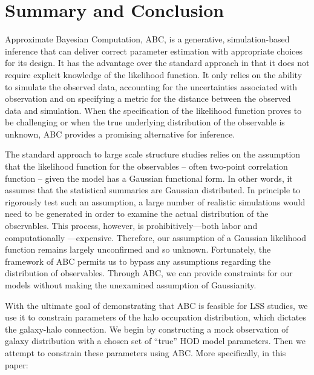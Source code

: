 \documentclass[fleqn,usenatbib]{mnras}
\begin{document}
\section{Summary and Conclusion}\label{sec:discussion}

Approximate Bayesian Computation, ABC, is a generative, simulation-based
inference that can deliver correct parameter estimation with
appropriate choices for its design.
It has the advantage over the standard approach in that it 
does not require explicit knowledge of the likelihood function. It only relies on the ability to simulate
the observed data, accounting for the uncertainties associated with observation and on specifying a metric 
for the distance between the observed data and simulation. When the specification of the likelihood function 
proves to be challenging or when the true underlying distribution of the observable is unknown, 
ABC provides a promising alternative for inference.

The standard approach to large scale structure studies relies on the assumption that the likelihood function 
for the observables -- often two-point correlation function -- given the model has a Gaussian functional form. 
In other words, it assumes that the statistical summaries are Gaussian distributed. In principle to rigorously 
test such an assumption, a large number of realistic simulations would need to be generated in order to examine 
the actual distribution of the observables. This process, however, is prohibitively---both labor and computationally 
---expensive. Therefore, our assumption of a Gaussian likelihood function remains largely unconfirmed and so 
unknown. Fortunately, the framework of ABC permits us to bypass any 
assumptions regarding the distribution of observables. Through ABC, we can provide constraints for our models without making the unexamined assumption of Gaussianity. 

With the ultimate goal of demonstrating that ABC is feasible for LSS studies, we use it to 
constrain parameters of the halo occupation distribution, which dictates the galaxy-halo connection. 
We begin by constructing a mock observation of galaxy distribution with a chosen set of ``true'' HOD model 
parameters. Then we attempt to constrain these parameters using ABC. More specifically, in this paper: 
\end{document}
